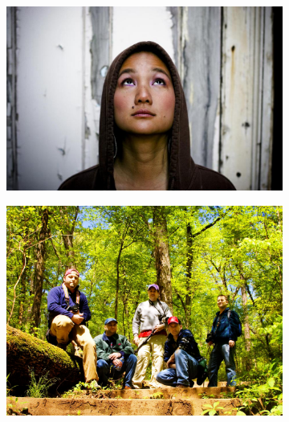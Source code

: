 \begin{figure}[t]
\begin{subfigure}[b]{0.3\textwidth}
\end{subfigure}
\begin{subfigure}[b]{0.3\textwidth}
    \includegraphics[width=\textwidth]{figures/data_4}
\end{subfigure}
\begin{subfigure}[b]{0.3\textwidth}
    \includegraphics[width=\textwidth]{figures/data_5}
\end{subfigure}
\begin{subfigure}[b]{0.3\textwidth}

\end{subfigure}
\end{figure}

